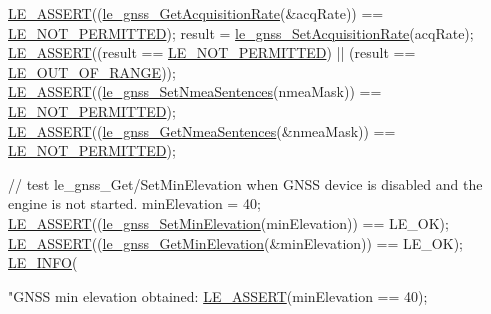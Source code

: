 \begin{DoxyCodeInclude}
    \hyperlink{le__log_8h_ac0dbbef91dc0fed449d0092ff0557b39}{LE\_ASSERT}((\hyperlink{le__gnss__interface_8h_acfa9b25ac13f601921bd9123a1d0daba}{le\_gnss\_GetAcquisitionRate}(&acqRate)) == 
      \hyperlink{le__basics_8h_a1cca095ed6ebab24b57a636382a6c86cac6c0cac62213b786dabd7bf3e73bcec1}{LE\_NOT\_PERMITTED});
    result = \hyperlink{le__gnss__interface_8h_a75d96ec7ac6e0d6b58525e4c523d3b2c}{le\_gnss\_SetAcquisitionRate}(acqRate);
    \hyperlink{le__log_8h_ac0dbbef91dc0fed449d0092ff0557b39}{LE\_ASSERT}((result == \hyperlink{le__basics_8h_a1cca095ed6ebab24b57a636382a6c86cac6c0cac62213b786dabd7bf3e73bcec1}{LE\_NOT\_PERMITTED}) || (result == 
      \hyperlink{le__basics_8h_a1cca095ed6ebab24b57a636382a6c86caef8ecf11fa8556fd2d3ca8faab697717}{LE\_OUT\_OF\_RANGE}));
    \hyperlink{le__log_8h_ac0dbbef91dc0fed449d0092ff0557b39}{LE\_ASSERT}((\hyperlink{le__gnss__interface_8h_ab9253e29d74cae6e962dcc8b94f0e3c1}{le\_gnss\_SetNmeaSentences}(nmeaMask)) == 
      \hyperlink{le__basics_8h_a1cca095ed6ebab24b57a636382a6c86cac6c0cac62213b786dabd7bf3e73bcec1}{LE\_NOT\_PERMITTED});
    \hyperlink{le__log_8h_ac0dbbef91dc0fed449d0092ff0557b39}{LE\_ASSERT}((\hyperlink{le__gnss__interface_8h_a985845ac33d35c34ac3099b6557ca8ea}{le\_gnss\_GetNmeaSentences}(&nmeaMask)) == 
      \hyperlink{le__basics_8h_a1cca095ed6ebab24b57a636382a6c86cac6c0cac62213b786dabd7bf3e73bcec1}{LE\_NOT\_PERMITTED});

    \textcolor{comment}{// test le\_gnss\_Get/SetMinElevation when GNSS device is disabled and the engine is not started.}
    minElevation = 40;
    \hyperlink{le__log_8h_ac0dbbef91dc0fed449d0092ff0557b39}{LE\_ASSERT}((\hyperlink{le__gnss__interface_8h_a78982eb8669530eef1bbc79ff79347e4}{le\_gnss\_SetMinElevation}(minElevation)) == LE\_OK);
    \hyperlink{le__log_8h_ac0dbbef91dc0fed449d0092ff0557b39}{LE\_ASSERT}((\hyperlink{le__gnss__interface_8h_ad8476e020a2eb0188703e78eed5818da}{le\_gnss\_GetMinElevation}(&minElevation)) == LE\_OK);
    \hyperlink{le__log_8h_a23e6d206faa64f612045d688cdde5808}{LE\_INFO}(\textcolor{stringliteral}{"GNSS min elevation obtained: %
    \hyperlink{le__log_8h_ac0dbbef91dc0fed449d0092ff0557b39}{LE\_ASSERT}(minElevation == 40);

}
\end{DoxyCodeInclude}
